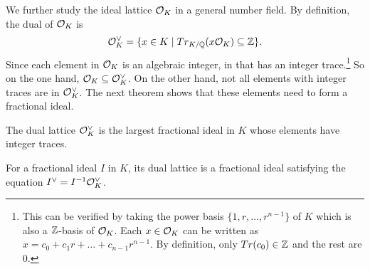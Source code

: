 \documentclass[../main.tex]{subfiles}
\begin{document}
We further study the ideal lattice $\mathcal{O}_K$ in a general number field. By definition, the dual of $\mathcal{O}_K$ is 
\begin{equation*}
    \mathcal{O}_K^{\vee} = \{x \in K \mid Tr_{K/\mathbb{Q}}(x \mathcal{O}_K) \subseteq \mathbb{Z}\}.
\end{equation*}
Since each element in $\mathcal{O}_K$ is an algebraic integer, in that has an integer trace.\footnote{This can be verified by taking the power basis $\{1, r, \dots, r^{n-1}\}$ of $K$ which is also a $\mathbb{Z}$-basis of $\mathcal{O}_K$. Each $x \in \mathcal{O}_K$ can be written as $x=c_0+c_1 r + \dots + c_{n-1}r^{n-1}$. By definition, only $Tr(c_0) \in \mathbb{Z}$ and the rest are 0.} So on the one hand, $\mathcal{O}_K \subseteq \mathcal{O}_K^{\vee}$. On the other hand, not all elements with integer traces are in $\mathcal{O}_K^{\vee}$. The next theorem shows that these elements need to form a fractional ideal. 

\begin{theorem}
\reversemarginpar
{}
The dual lattice $\mathcal{O}_K^{\vee}$ is the largest fractional ideal in $K$ whose elements have integer traces. 
\end{theorem}
\iffalse
\begin{proof}
Let $I$ be a fractional ideal in $K$. By definition of fractional ideal, we have $I\ok=I$. Then we have 
\begin{align*}
    Tr(I) \subseteq \Z \iff Tr(I\ok)\subseteq \Z \iff I \subseteq \dual{\ok}
\end{align*}
The largest such fractional ideal is precisely the dual. If there is a set whose elements have all integer trace but not a fractional ideal, then the first ``iff'' does not follow.  If there is a larger fractional ideal who contains an element with non-integer trace, then it does not in the dual.
\end{proof}
\fi

\begin{theorem}
\label{thm:fracIdealDual}
For a fractional ideal $I$ in $K$, its dual lattice is a fractional ideal satisfying the equation $I^{\vee} = I^{-1} \mathcal{O}_K^{\vee}$.
\end{theorem}
\end{document}
